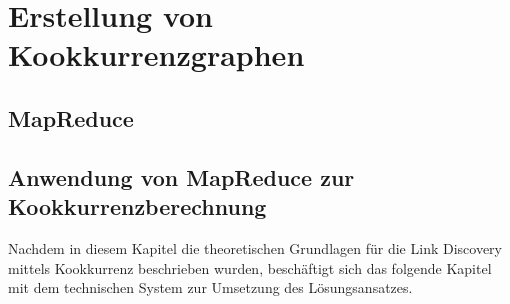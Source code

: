 \chapter{Erstellung von Kookkurrenzgraphen}

\section{MapReduce}


\section{Anwendung von MapReduce zur Kookkurrenzberechnung}


Nachdem in diesem Kapitel die theoretischen Grundlagen für die Link Discovery mittels Kookkurrenz beschrieben wurden, beschäftigt sich das folgende Kapitel mit dem technischen System zur Umsetzung des Lösungsansatzes.